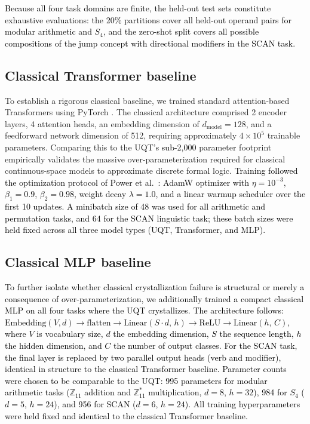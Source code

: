 \documentclass[11pt, a4paper]{article}
\begin{document}
\textcolor{black}{Because all four task domains are finite, the held-out test sets constitute exhaustive evaluations: the 20\% partitions cover all held-out operand pairs for modular arithmetic and $S_4$, and the zero-shot split covers all possible compositions of the jump concept with directional modifiers in the SCAN task.}

\subsection*{Classical Transformer baseline} To establish a rigorous classical baseline, we trained standard attention-based Transformers using PyTorch \cite{paszke2019pytorch}. The classical architecture comprised 2 encoder layers, 4 attention heads, an embedding dimension of $d_{\text{model}}=128$, and a feedforward network dimension of 512, requiring approximately $4 \times 10^5$ trainable parameters. Comparing this to the UQT's \textcolor{black}{sub-2,000} parameter footprint empirically validates the massive over-parameterization required for classical continuous-space models to approximate discrete formal logic. \textcolor{black}{Training followed the optimization protocol of Power et al.\ \cite{power2022grokking}: AdamW optimizer with $\eta{=}10^{-3}$, $\beta_1{=}0.9$, $\beta_2{=}0.98$, weight decay $\lambda{=}1.0$, and a linear warmup scheduler over the first 10 updates. A minibatch size of 48 was used for all arithmetic and permutation tasks, and 64 for the SCAN linguistic task; these batch sizes were held fixed across all three model types (UQT, Transformer, and MLP). }

\subsection*{Classical MLP baseline} \textcolor{black}{To further isolate whether classical crystallization failure is structural or merely a consequence of over-parameterization, we additionally trained a compact classical MLP on all four tasks where the UQT crystallizes. The architecture follows: $\text{Embedding}(V, d) \rightarrow \text{flatten} \rightarrow \text{Linear}(S \cdot d,\, h) \rightarrow \text{ReLU} \rightarrow \text{Linear}(h,\, C)$, where $V$ is vocabulary size, $d$ the embedding dimension, $S$ the sequence length, $h$ the hidden dimension, and $C$ the number of output classes. For the SCAN task, the final layer is replaced by two parallel output heads (verb and modifier), identical in structure to the classical Transformer baseline. Parameter counts were chosen to be comparable to the UQT: 995 parameters for modular arithmetic tasks ($\mathbb{Z}_{11}$ addition and $\mathbb{Z}_{11}^*$ multiplication, $d{=}8$, $h{=}32$), 984 for $S_4$ ($d{=}5$, $h{=}24$), and 956 for SCAN ($d{=}6$, $h{=}24$). All training hyperparameters were held fixed and identical to the classical Transformer baseline.}
\end{document}
